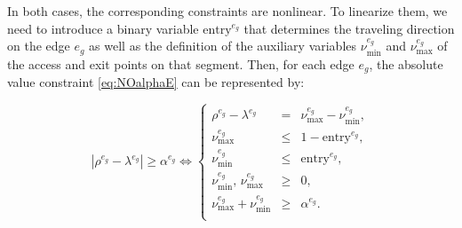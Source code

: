 \documentclass[10pt,a4paper]{elsarticle}
\begin{document}
\bigskip
\noindent
In both cases, the corresponding constraints are nonlinear. To linearize them, we need to introduce a binary variable $\text{entry}^{e_g}$ that determines the traveling direction on the edge $e_g$ as well as the definition of the auxiliary variables $\nu_\text{min}^{e_g}$ and $\nu_\text{max}^{e_g}$ of the access and exit points on that segment. Then, for each edge $e_g$, the absolute value constraint \eqref{eq:NOalphaE} can be represented by:


\begin{equation}\label{eq:NOalpha-E}\tag{$\alpha$-E}
	|\rho^{e_g}-\lambda^{e_g}|\geq \alpha^{e_g} \Longleftrightarrow
	\left\{
	\begin{array}{ccl}
		\rho^{e_g} - \lambda^{e_g}                       & =    & \nu_\text{max}^{e_g} - \nu_\text{min}^{e_g},                                     \\
		\nu_\text{max}^{e_g}                         & \leq & 1-{\text{entry}^{e_g}},                                   \\
		\nu_\text{min}^{e_g}                      & \leq & {  \text{entry}^{e_g}},                                        \\
		\nu_\text{min}^{e_g}, \,\nu_\text{max}^{e_g} & \geq & 0, \\
		
		\nu_\text{max}^{e_g} + \nu_\text{min}^{e_g} & \geq & \alpha^{e_g}.
		\\
	\end{array}
	\right.
\end{equation}
\end{document}
